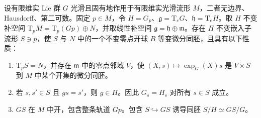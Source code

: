 \begin{lemma}\label{g1:lem:proper-slice-construction}
	设有限维实 Lie 群 \(G\) 光滑且固有地作用于有限维实光滑流形 \(M\)，二者无边界、Hausdorff、第二可数。固定 \(p\in M\)，令 \(H=G_p\)、\(\mathfrak g=\mathrm{T}_eG\)、\(\mathfrak h=\mathrm{T}_eH\)。取 \(H\) 不变补空间 \(\mathrm{T}_pM=\mathrm{T}_p(Gp)\oplus N\)，并取线性补空间 \(\mathfrak g=\mathfrak h\oplus\mathfrak m\)。存在 \(H\) 不变嵌入子流形 \(S\ni p\)，使 \(S\) 与 \(N\) 中的一个不变零点开球 \(B\) 等变微分同胚，且具有以下性质：
	\begin{enumerate}
		\item \(\mathrm{T}_pS=N\)，并存在 \(\mathfrak m\) 中的零点邻域 \(V\)，使 \((X,s)\mapsto\exp_G(X)s\) 是 \(V\times S\) 到 \(M\) 中某个开集的微分同胚。
		\item 若 \(s,s'\in S\) 且 \(gs=s'\)，则 \(g\in H\)。因此 \(G_s=H_s\) 对所有 \(s\in S\) 成立。
		\item \(GS\) 在 \(M\) 中开，包含整条轨道 \(Gp\)。包含 \(S\hookrightarrow GS\) 诱导同胚 \(S/H\simeq GS/G\)。
	\end{enumerate}
\end{lemma}
